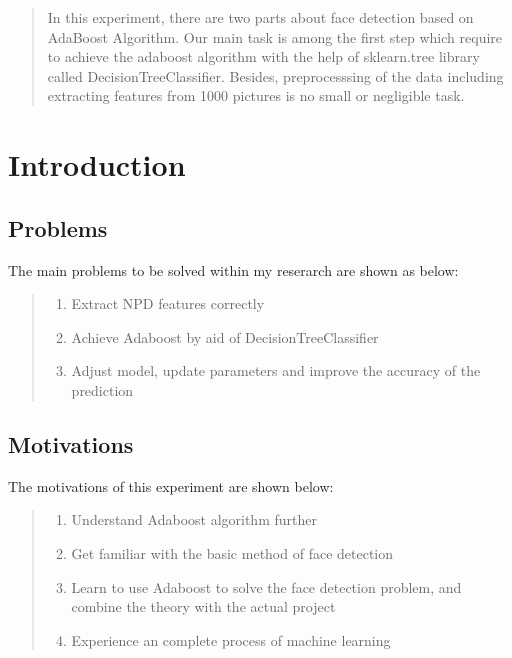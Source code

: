 \documentclass[journal, a4paper]{IEEEtran}
\begin{document}
\begin{abstract}
In this experiment, there are two parts about face detection based on AdaBoost Algorithm. Our main task is among the first step which require to achieve the adaboost algorithm with the help of sklearn.tree library called DecisionTreeClassifier. Besides, preprocesssing of the data including extracting features from 1000 pictures is no small or negligible task.
\end{abstract}

\section{Introduction}
\subsection{Problems}
The main problems to be solved within my reserarch are shown as below:
	\begin{quote}
	\begin{enumerate} 
	\item Extract NPD features correctly
	\item Achieve Adaboost by aid of DecisionTreeClassifier
	\item Adjust model, update parameters and improve the accuracy of the prediction
	\end{enumerate} 
    \end{quote}		
		
\subsection{Motivations}
	The motivations of this experiment are shown below:
	\begin{quote}
	\begin{enumerate} 
	\item Understand Adaboost algorithm further
	\item Get familiar with the basic method of face detection
	\item Learn to use Adaboost to solve the face detection problem, and combine the theory with the actual project
	\item Experience an complete process of machine learning
	\end{enumerate} 
    \end{quote}	
\end{document}
